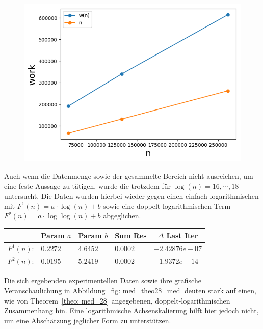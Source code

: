 \begin{figure}[H]
    \hspace*{.4cm}
    \begin{minipage}[t]{.30\textwidth}
        \centering
        \includegraphics[width=\textwidth]{pictures/med_algo_theo28_work.png}
    \end{minipage}
    \vspace*{-0.1cm}
    \label{fig: med_theo28_work}
\end{figure}


\noindent
Auch wenn die Datenmenge sowie der gesammelte Bereich nicht ausreichen, um eine feste Aussage zu tätigen, wurde die \fg trotzdem für $\log(n)=16,\cdots,18$ untersucht. Die Daten wurden hierbei wieder gegen einen einfach-logarithmischen mit $F^1(n)=a\cdot\log(n) + b$ sowie eine doppelt-logarithmischen Term $F^2(n)=a\cdot\log\log(n) + b$ abgeglichen.

\begin{center}
\begin{tabular}{c||l|l|l|l}

&\multicolumn{1}{c|}{Param $a$}&
\multicolumn{1}{c|}{Param $b$}&
\multicolumn{1}{c|}{Sum Res}&
\multicolumn{1}{c}{$\Delta$ Last Iter}\\
\hline
$F^1(n)$:&$0.2272$&$4.6452$&$0.0002$&$-2.42876e-07$\\
\hline
$F^2(n)$:&$0.0195$&$5.2419$&$0.0002$&$-1.9372e-14
$
\end{tabular}
\end{center}
Die sich ergebenden experimentellen Daten sowie ihre grafische Veranschaulichung in Abbildung~\ref{fig: med_theo28_med} deuten stark auf einen, wie von Theorem~\ref{theo: med_28} angegebenen, doppelt-logarithmischen Zusammenhang hin. Eine logarithmische Achsenskalierung hilft hier jedoch nicht, um eine Abschätzung jeglicher Form zu unterstützen. 


